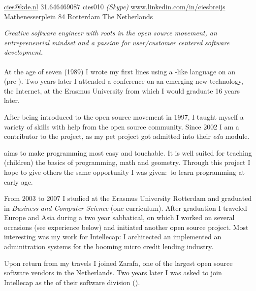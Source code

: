 \documentclass[10pt,a4paper]{article}
\begin{document}

\nobreakvspace{0.3em}

\noindent\href{mailto:cies.at.kde.dot.nl}{cies\mbox{}@\mbox{}kde.nl}\sbull %
\textsmaller{+}31.646469087\sbull
cies010 \emph{(Skype)}\sbull
\href{http://www.linkedin.com/in/ciesbreijs}{www.linkedin.com/in/ciesbreijs}
\\
Mathenesserplein 84\sbull
Rotterdam\sbull
The Netherlands


\spacedhrule{0.9em}{-0.4em}


\vspace{-1.3em}
\begin{multicols}{2}
\noindent \emph{Creative software engineer with roots in the open source movement, an entrepreneurial mindset and a passion for user/customer centered software development.}
\\
\\
At the age of seven (1989) I wrote my first lines using a -like language on an  (pre-).  Two years later I attended a conference on an emerging new technology, the Internet, at the Erasmus University from which I would graduate 16 years later.

After being introduced to the open source movement in 1997, I taught myself a variety of skills with help from the open source community.  Since 2002 I am a contributor to the  project, as my pet project \KTurtle got admitted into their \emph{edu} module.

\KTurtle aims to make programming most easy and touchable.  It is well suited for teaching (children) the basics of programming, math and geometry. Through this project I hope to give others the same opportunity I was given:\ to learn programming at early age.

From 2003 to 2007 I studied at the Erasmus University Rotterdam and graduated in \emph{Business and Computer Science} (one curriculum).  After graduation I traveled Europe and Asia during a two year sabbatical, on which I worked on several occasions (see experience below) and initiated another open source project.  Most interesting was my work for Intellecap: I architected an implemented an adminitration systems for the booming micro credit lending industry.

Upon return from my travels I joined Zarafa, one of the largest open source software vendors in the Netherlands.  Two years later I was asked to join Intellecap as the  of their software division ().
\end{multicols}
\end{document}
